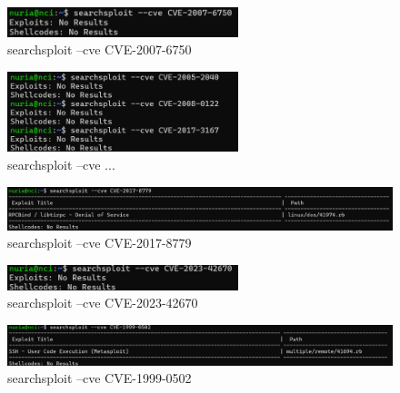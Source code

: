 \documentclass[a4paper,12pt]{article} %
\begin{document}
            \begin{figure} [hp!]
             \centering
             \includegraphics[width=0.6\textwidth]{imagenes/cvelinux22.png}
             \caption{ searchsploit --cve CVE-2007-6750}
             \label{fig:linux22}
            \end{figure}

\newpage
            \begin{figure} [hp!]
             \centering
             \includegraphics[width=0.6\textwidth]{imagenes/cvelinux23.png}
             \caption{ searchsploit --cve ...}
             \label{fig:linux23}
            \end{figure}

            \begin{figure} [hp!]
             \centering
             \includegraphics[width=1\textwidth]{imagenes/cvelinux24.png}
             \caption{ searchsploit --cve CVE-2017-8779}
             \label{fig:linux24}
            \end{figure}

            \begin{figure} [hp!]
             \centering
             \includegraphics[width=0.6\textwidth]{imagenes/cvelinux25.png}
             \caption{ searchsploit --cve CVE-2023-42670}
             \label{fig:linux25}
            \end{figure}

            \begin{figure} [hp!]
             \centering
             \includegraphics[width=1\textwidth]{imagenes/cvelinux26.png}
             \caption{ searchsploit --cve CVE-1999-0502}
             \label{fig:linux26}
            \end{figure}
\end{document}
